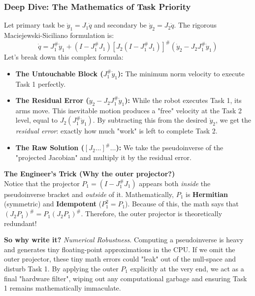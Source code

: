 \documentclass[11pt,a4paper]{article}
\begin{document}
\subsubsection{Deep Dive: The Mathematics of Task Priority}
Let primary task be $\dot{y}_1 = J_1 \dot{q}$ and secondary be $\dot{y}_2 = J_2 \dot{q}$. The rigorous Maciejewski-Siciliano formulation is:
\begin{equation}
    \dot{q} = J_1^\# \dot{y}_1 + (I - J_1^\# J_1) \left[ J_2(I - J_1^\# J_1) \right]^\# (\dot{y}_2 - J_2 J_1^\# \dot{y}_1)
\end{equation}
Let's break down this complex formula:
\begin{itemize}
    \item \textbf{The Untouchable Block ($J_1^\# \dot{y}_1$):} The minimum norm velocity to execute Task 1 perfectly.
    \item \textbf{The Residual Error ($\dot{y}_2 - J_2 J_1^\# \dot{y}_1$):} While the robot executes Task 1, its arms move. This inevitable motion produces a "free" velocity at the Task 2 level, equal to $J_2 (J_1^\# \dot{y}_1)$. By subtracting this from the desired $\dot{y}_2$, we get the \textit{residual error}: exactly how much "work" is left to complete Task 2.
    \item \textbf{The Raw Solution ($\left[ J_2 \dots \right]^\# \dots$):} We take the pseudoinverse of the "projected Jacobian" and multiply it by the residual error.
\end{itemize}

\begin{examtip}
\textbf{The Engineer's Trick (Why the outer projector?)}\\
Notice that the projector $P_1 = (I - J_1^\# J_1)$ appears both \textit{inside} the pseudoinverse bracket and \textit{outside} of it. 
Mathematically, $P_1$ is \textbf{Hermitian} (symmetric) and \textbf{Idempotent} ($P_1^2 = P_1$). Because of this, the math says that $(J_2 P_1)^\# = P_1 (J_2 P_1)^\#$. Therefore, the outer projector is theoretically redundant! 

\textbf{So why write it?} \textit{Numerical Robustness}. Computing a pseudoinverse is heavy and generates tiny floating-point approximations in the CPU. If we omit the outer projector, these tiny math errors could "leak" out of the null-space and disturb Task 1. By applying the outer $P_1$ explicitly at the very end, we act as a final "hardware filter", wiping out any computational garbage and ensuring Task 1 remains mathematically immaculate.
\end{examtip}
\end{document}
